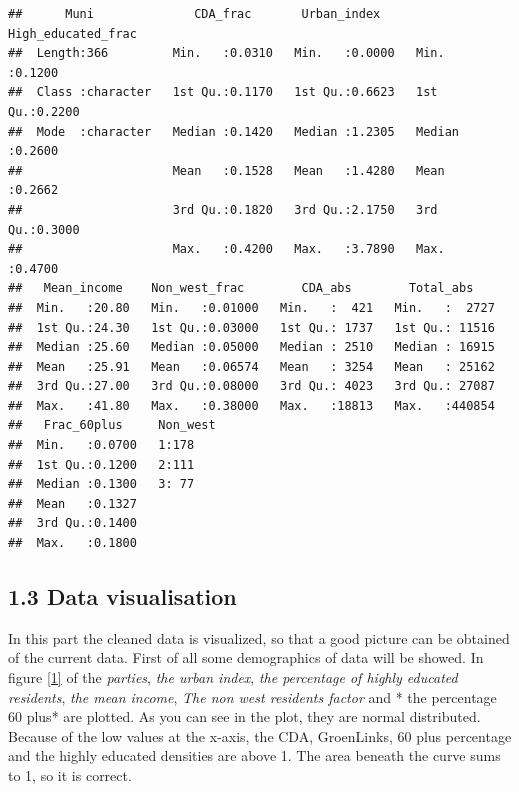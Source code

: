 \documentclass[11pt,]{article}
\begin{document}
\begin{verbatim}
##      Muni              CDA_frac       Urban_index     High_educated_frac
##  Length:366         Min.   :0.0310   Min.   :0.0000   Min.   :0.1200    
##  Class :character   1st Qu.:0.1170   1st Qu.:0.6623   1st Qu.:0.2200    
##  Mode  :character   Median :0.1420   Median :1.2305   Median :0.2600    
##                     Mean   :0.1528   Mean   :1.4280   Mean   :0.2662    
##                     3rd Qu.:0.1820   3rd Qu.:2.1750   3rd Qu.:0.3000    
##                     Max.   :0.4200   Max.   :3.7890   Max.   :0.4700    
##   Mean_income    Non_west_frac        CDA_abs        Total_abs     
##  Min.   :20.80   Min.   :0.01000   Min.   :  421   Min.   :  2727  
##  1st Qu.:24.30   1st Qu.:0.03000   1st Qu.: 1737   1st Qu.: 11516  
##  Median :25.60   Median :0.05000   Median : 2510   Median : 16915  
##  Mean   :25.91   Mean   :0.06574   Mean   : 3254   Mean   : 25162  
##  3rd Qu.:27.00   3rd Qu.:0.08000   3rd Qu.: 4023   3rd Qu.: 27087  
##  Max.   :41.80   Max.   :0.38000   Max.   :18813   Max.   :440854  
##   Frac_60plus     Non_west
##  Min.   :0.0700   1:178   
##  1st Qu.:0.1200   2:111   
##  Median :0.1300   3: 77   
##  Mean   :0.1327           
##  3rd Qu.:0.1400           
##  Max.   :0.1800
\end{verbatim}

\subsection{1.3 Data visualisation}\label{data-visualisation}

In this part the cleaned data is visualized, so that a good picture can
be obtained of the current data. First of all some demographics of data
will be showed. In figure \ref{1} of the \emph{parties}, \emph{the urban
index}, \emph{the percentage of highly educated residents}, \emph{the
mean income}, \emph{The non west residents factor} and * the percentage
60 plus* are plotted. As you can see in the plot, they are normal
distributed. Because of the low values at the x-axis, the CDA,
GroenLinks, 60 plus percentage and the highly educated densities are
above 1. The area beneath the curve sums to 1, so it is correct.
\end{document}
